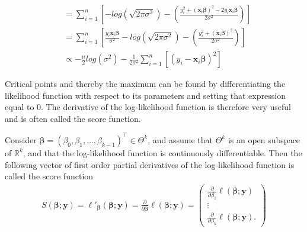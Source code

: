 \begin{example}
\begin{align*}
   &= \sum_{i = 1}^n \left[- log\left( \sqrt{2 \pi \sigma^2}\right) - \left(\frac{y_i^2 + (\textbf{x}_i\boldsymbol{\beta})^2 - 2y_i\textbf{x}_i\boldsymbol{\beta}}{2 \sigma^2}\right) \right]\\
   &= \sum_{i = 1}^n \left[\frac{y_i \textbf{x}_i\boldsymbol{\beta}}{\sigma^2} - log\left( \sqrt{2 \pi \sigma^2}\right) - \left( \frac{y_i^2 + (\textbf{x}_i\boldsymbol{\beta})^2}{2\sigma^2} \right) \right] \\
   &\propto - \frac{n}{2}log( \sigma^2) - \frac{1}{2\sigma^2} \sum_{i = 1}^n \left[(y_i -\textbf{x}_i\boldsymbol{\beta})^2  \right]
\end{align*}
\end{example}
Critical points and thereby the maximum can be found by differentiating the likelihood function with respect to its parameters and setting that expression equal to 0. 
The derivative of the log-likelihood function is therefore very useful and is often called the score function. 
\begin{definition}
\label{def:score_function}
Consider $\boldsymbol{\beta} = (\beta_0, \beta_1, \ldots, \beta_{k-1})^\top \in \Theta^k$, and assume that $\Theta^k$ is an open subspace of $\mathbb{R}^k$, and that the log-likelihood function is continuously differentiable. 
Then the following vector of first order partial derivatives of the log-likelihood function is called the score function
\begin{align*}
    S(\boldsymbol{\beta}; \textbf{y}) = \ell'_{\boldsymbol{\beta}}(\boldsymbol{\beta}; \textbf{y}) = \frac{\partial}{\partial \boldsymbol{\beta}} \ell (\boldsymbol{\beta}; \textbf{y}) = 
    \begin{pmatrix}
        \frac{\partial}{\partial \beta_1}\ell (\boldsymbol{\beta}; \textbf{y}) \\
        \vdots \\
        \frac{\partial}{\partial \beta_k}\ell (\boldsymbol{\beta}; \textbf{y}).
    \end{pmatrix}
\end{align*}
\end{definition}
